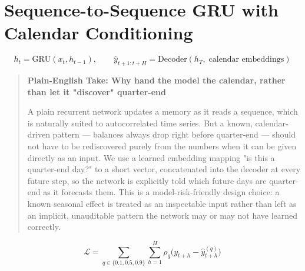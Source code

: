 \documentclass[11pt]{report}
\newenvironment{feynman}[1]{%
  \begin{quote}\small\color{black}
  \colorbox{feynman}{\parbox{0.97\linewidth}{\vspace{2pt}\textbf{\color{navy}Plain-English Take: #1}\\[2pt]
}}
}{\end{quote}}
\begin{document}
\section{Sequence-to-Sequence GRU with Calendar Conditioning}
\begin{equation}
h_t = \text{GRU}(x_t, h_{t-1}), \qquad \hat y_{t+1:t+H} = \text{Decoder}(h_T,\; \text{calendar embeddings})
\end{equation}
\begin{feynman}{Why hand the model the calendar, rather than let it "discover" quarter-end}
A plain recurrent network updates a memory as it reads a sequence, which is naturally suited to
autocorrelated time series. But a known, calendar-driven pattern — balances always drop right before
quarter-end — should not have to be rediscovered purely from the numbers when it can be given directly
as an input. We use a learned embedding mapping "is this a quarter-end day?" to a short vector,
concatenated into the decoder at every future step, so the network is explicitly told which future days
are quarter-end as it forecasts them. This is a model-risk-friendly design choice: a known seasonal
effect is treated as an inspectable input rather than left as an implicit, unauditable pattern the
network may or may not have learned correctly.
\end{feynman}
\begin{equation}
\mathcal{L} = \sum_{q\in\{0.1,0.5,0.9\}} \sum_{h=1}^{H} \rho_q\big(y_{t+h} - \hat y_{t+h}^{(q)}\big)
\end{equation}
\end{document}
